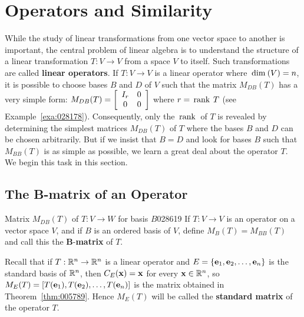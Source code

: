 \section{Operators and Similarity}
\label{sec:9_2}

While the study of linear transformations from one vector space to another is important, the central problem of linear algebra is to understand the structure of a linear transformation $T : V \to V$ from a space $V$ to itself. Such transformations are called \textbf{linear operators}. If $T : V \to V$ is a linear operator where $\thinspace\operatorname{dim\medspace}(V) = n$, it is possible to choose bases $B$ and $D$ of $V$ such that the matrix $M_{DB}(T)$ has a very simple form: $M_{DB}(T) = \left[ \begin{array}{cc} I_r & 0 \\ 0 & 0 \end{array} \right]$ where $r = \thinspace\operatorname{rank \medspace}T$ (see Example~\ref{exa:028178}). Consequently, only the $\thinspace\operatorname{rank\medspace}$ of $T$ is revealed by determining the simplest matrices $M_{DB}(T)$ of $T$ where the bases $B$ and $D$ can be chosen arbitrarily. But if we insist that $B = D$ and look for bases $B$ such that $M_{BB}(T)$ is as simple as possible, we learn a great deal about the operator $T$. We begin this task in this section.


\subsection*{The B-matrix of an Operator}


\begin{definition}{Matrix $M_{DB}(T)$ of $T : V \to W$ for basis $B$}{028619}
If $T : V \to V$ is an operator on a vector space $V$, and if $B$ is an ordered basis of $V$, define $M_{B}(T) = M_{BB}(T)$ and call this the $\bm{B}$-\textbf{matrix} of $T$.
\end{definition}

Recall that if $T : \mathbb{R}^n \to \mathbb{R}^n$ is a linear operator and $E = \{\textbf{e}_{1}, \textbf{e}_{2}, \dots, \textbf{e}_{n}\}$ is the standard basis of $\mathbb{R}^n$, then $C_{E}(\textbf{x}) = \textbf{x}$ for every $\textbf{x} \in \mathbb{R}^n$, so $M_{E}(T) = \left[ T(\textbf{e}_{1}), T(\textbf{e}_{2}), \dots, T(\textbf{e}_{n})\right]$ is the matrix obtained in Theorem~\ref{thm:005789}. Hence $M_{E}(T)$ will be called the \textbf{standard matrix} of the operator $T$.

